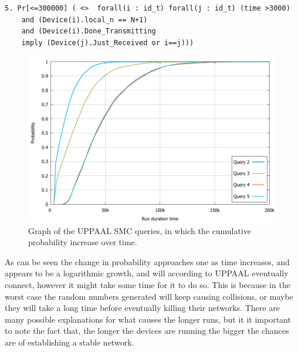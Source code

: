 \begin{lstlisting}[style=UPPAAL, title={This query is a generalisation of the previous which includes a check of whether when one device finish transmitting then the rest are just finished receiving. UPPAAL runs this query and within 3451 runs [0.998,1] with confidence 99.9 \% this is true.}]
5. Pr[<=300000] ( <>  forall(i : id_t) forall(j : id_t) (time >3000) 
    and (Device(i).local_n == N+1) 
    and (Device(i).Done_Transmitting 
    imply (Device(j).Just_Received or i==j)))
\end{lstlisting}


\begin{figure}
  \includegraphics[width=1\textwidth]{Figures/Graphs/gnuplot/uppaal/graph.pdf} 
\caption{Graph of the UPPAAL SMC queries, in which the cumulative probability increase over time.}
\label{fig:ConnectQueryTime}
\end{figure}


As can be seen the change in probability approaches one as time increases, and appears to be a logarithmic growth, and will according to UPPAAL eventually connect, however it might take some time for it to do so.
This is because in the worst case the random numbers generated will keep causing collisions, or maybe they will take a long time before eventually killing their networks.
There are many possible explanations for what causes the longer runs, but it it important to note the fact that, the longer the devices are running the bigger the chances are of establishing a stable network.



